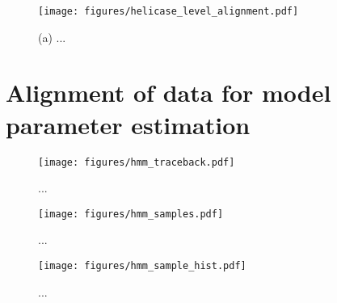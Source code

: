 \begin{figure}[h]
\begin{centering}
\texttt{[image: figures/helicase\_level\_alignment.pdf]}
\caption[Data analysis: Viterbi level alignment to model]{(a) ...}
\label{fig:data_analysis_alignment}
\end{centering}
\end{figure}

\section{Alignment of data for model parameter estimation}

\begin{figure}[h]
\begin{centering}
\texttt{[image: figures/hmm\_traceback.pdf]}
\caption[Data analysis: parameter estimation MCMC proposals]{...}
\label{fig:data_analysis_traceback}
\end{centering}
\end{figure}

\begin{figure}[h]
\begin{centering}
\texttt{[image: figures/hmm\_samples.pdf]}
\caption[Data analysis: parameter estimation MCMC sampling]{...}
\label{fig:data_analysis_hmm_samples}
\end{centering}
\end{figure}

\begin{figure}[h]
\begin{centering}
\texttt{[image: figures/hmm\_sample\_hist.pdf]}
\caption[Data analysis: parameter estimation posteriors]{...}
\label{fig:data_analysis_hmm_sample_hist}
\end{centering}
\end{figure}

